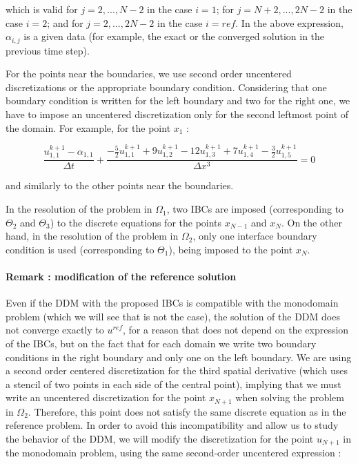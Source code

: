 \noindent which is valid for $j=2,...,N-2$ in the case $i=1$; for $j=N+2,...,2N-2$ in the case $i=2$; and for $j=2,...,2N-2$ in the case $i=ref$. In the above expression, $\alpha_{i,j}$ is a given data (for example, the exact or the converged solution in the previous time step).

\indent For the points near the boundaries, we use second order uncentered discretizations or the appropriate boundary condition. Considering that one boundary condition is written for the left boundary and two for the right one, we have to impose an uncentered discretization only for the second leftmost point of the domain. For example, for the point $x_1$ : 

\begin{equation*}
    \frac{u_{1,1}^{k+1} - \alpha_{1,1}}{\Delta t} + \frac{-\frac{5}{2}u_{1,1}^{k+1} + 9u_{1,2}^{k+1} - 12 u_{1,3}^{k+1} + 7 u_{1,4}^{k+1} -\frac{3}{2}u_{1,5}^{k+1}}{\Delta x ^3} = 0
\end{equation*}

\noindent and similarly to the other points near the boundaries.

\indent In the resolution of the problem in $\Omega_1$, two IBCs are imposed (corresponding to $\Theta_2$ and $\Theta_3$) to the discrete equations for the points $x_{N-1}$ and $x_N$. On the other hand, in the resolution of the problem in $\Omega_2$, only one interface boundary condition is used (corresponding to $\Theta_1$), being imposed to the point $x_N$.

\paragraph{Remark : modification of the reference solution}

\indent  Even if the DDM with the proposed IBCs is compatible with the monodomain problem (which we will see that is not the case), the solution of the DDM does not converge exactly to $u^{ref}$, for a reason that does not depend on the expression of the IBCs, but on the fact that for each domain we write two boundary conditions in the right boundary and only one on the left boundary. We are using a second order centered discretization for the third spatial derivative (which uses a stencil of two points in each side of the central point), implying that we must write an uncentered discretization for the point $x_{N+1}$ when solving the problem in $\Omega_2$. Therefore, this point does not satisfy the same discrete equation as in the reference problem. In order to avoid this incompatibility and allow us to study the behavior of the DDM, we will modify the discretization for the point $u_{N+1}$ in the monodomain problem, using the same second-order uncentered expression :

